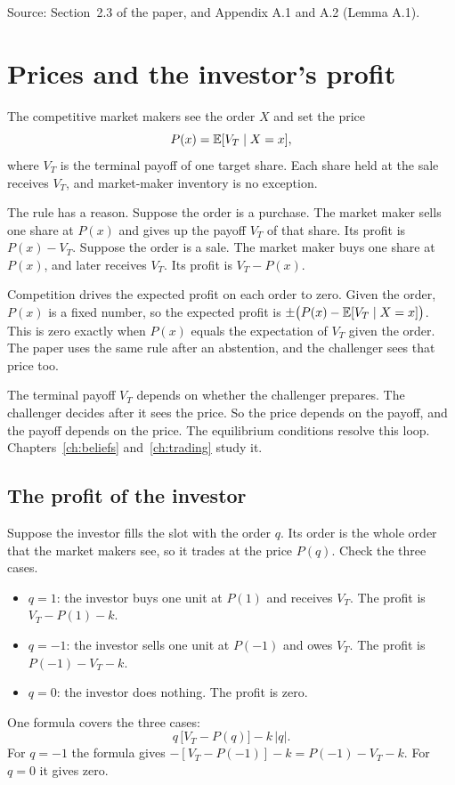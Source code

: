 {\small\color{notegrey}Source: Section~2.3 of the paper, and Appendix A.1 and A.2 (Lemma A.1).}

\section{Prices and the investor's profit}\label{sec:model-prices}

The competitive market makers see the order \(X\) and set the price
\[
P(x)=\mathbb{E}[V_T\mid X=x],
\]
where \(V_T\) is the terminal payoff of one target share.
Each share held at the sale receives \(V_T\), and market-maker inventory is no exception.

The rule has a reason.
Suppose the order is a purchase. The market maker sells one share at \(P(x)\) and gives up the payoff \(V_T\) of that share. Its profit is \(P(x)-V_T\).
Suppose the order is a sale. The market maker buys one share at \(P(x)\), and later receives \(V_T\). Its profit is \(V_T-P(x)\).

Competition drives the expected profit on each order to zero.
Given the order, \(P(x)\) is a fixed number, so the expected profit is \(\pm\bigl(P(x)-\mathbb{E}[V_T\mid X=x]\bigr)\).
This is zero exactly when \(P(x)\) equals the expectation of \(V_T\) given the order.
The paper uses the same rule after an abstention, and the challenger sees that price too.

\begin{watchout}
The terminal payoff \(V_T\) depends on whether the challenger prepares.
The challenger decides after it sees the price.
So the price depends on the payoff, and the payoff depends on the price.
The equilibrium conditions resolve this loop. Chapters~\ref{ch:beliefs} and~\ref{ch:trading} study it.
\end{watchout}

\subsection*{The profit of the investor}

Suppose the investor fills the slot with the order \(q\).
Its order is the whole order that the market makers see, so it trades at the price \(P(q)\).
Check the three cases.
\begin{itemize}
\item \(q=1\): the investor buys one unit at \(P(1)\) and receives \(V_T\). The profit is \(V_T-P(1)-k\).
\item \(q=-1\): the investor sells one unit at \(P(-1)\) and owes \(V_T\). The profit is \(P(-1)-V_T-k\).
\item \(q=0\): the investor does nothing. The profit is zero.
\end{itemize}
One formula covers the three cases:
\begin{equation}\label{eq:model-profit}
q\,\bigl[V_T-P(q)\bigr]-k\,|q|.
\end{equation}
For \(q=-1\) the formula gives \(-[V_T-P(-1)]-k=P(-1)-V_T-k\). For \(q=0\) it gives zero.


